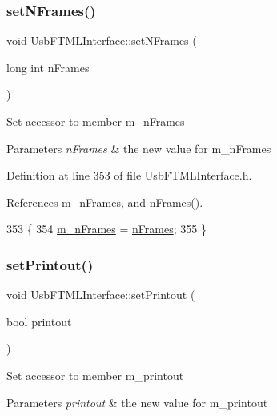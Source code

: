 \subsubsection{\texorpdfstring{set\+N\+Frames()}{setNFrames()}}
{\footnotesize\ttfamily void Usb\+F\+T\+M\+L\+Interface\+::set\+N\+Frames (\begin{DoxyParamCaption}\item[{long int}]{n\+Frames }\end{DoxyParamCaption})\hspace{0.3cm}{\ttfamily [inline]}}

Set accessor to member m\+\_\+n\+Frames 
\begin{DoxyParams}{Parameters}
{\em n\+Frames} & the new value for m\+\_\+n\+Frames \\
\hline
\end{DoxyParams}


Definition at line 353 of file Usb\+F\+T\+M\+L\+Interface.\+h.



References m\+\_\+n\+Frames, and n\+Frames().


\begin{DoxyCode}
353                                      \{
354     \hyperlink{classUsbFTMLInterface_ac7b9fb80fb8653a366c53ce3567cb823}{m\_nFrames} = \hyperlink{classUsbFTMLInterface_a55531536a54b736b9c9c38bb792ec4c9}{nFrames};
355   \}
\end{DoxyCode}
\mbox{\label{classUsbFTMLInterface_a807c9a67253303a7bc1b14558b9819ac}} 
\subsubsection{\texorpdfstring{set\+Printout()}{setPrintout()}}
{\footnotesize\ttfamily void Usb\+F\+T\+M\+L\+Interface\+::set\+Printout (\begin{DoxyParamCaption}\item[{bool}]{printout }\end{DoxyParamCaption})\hspace{0.3cm}{\ttfamily [inline]}}

Set accessor to member m\+\_\+printout 
\begin{DoxyParams}{Parameters}
{\em printout} & the new value for m\+\_\+printout \\
\hline
\end{DoxyParams}


